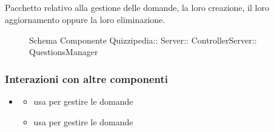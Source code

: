 \subsection{}
Pacchetto relativo alla gestione delle domande, la loro creazione, il loro aggiornamento oppure la loro eliminazione.
\begin{figure}[H]
\centering
\noindent{}
\caption[Schema Componente QuestionsManager]{Schema Componente Quizzipedia:: Server:: ControllerServer:: QuestionsManager}
\end{figure}
\subsubsection{Interazioni con altre componenti}
\begin{itemize}
\item {}
\begin{itemize}
\item usa  per gestire le domande
\item usa  per gestire le domande
\end{itemize}
\end{itemize}
